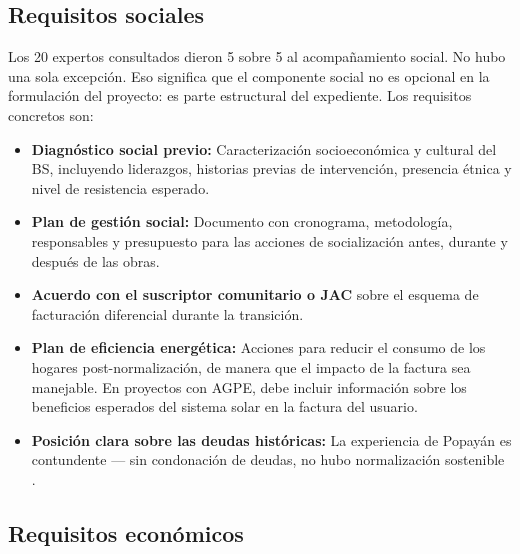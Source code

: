 \subsection{Requisitos sociales}
\label{subsec:req_sociales}

Los 20 expertos consultados dieron 5 sobre 5 al acompañamiento social.
No hubo una sola excepción. Eso significa que el componente social no
es opcional en la formulación del proyecto: es parte estructural del
expediente. Los requisitos concretos son:

\begin{itemize}
    \item \textbf{Diagnóstico social previo:} Caracterización
    socioeconómica y cultural del BS, incluyendo liderazgos, historias
    previas de intervención, presencia étnica y nivel de resistencia
    esperado.

    \item \textbf{Plan de gestión social:} Documento con cronograma,
    metodología, responsables y presupuesto para las acciones de
    socialización antes, durante y después de las obras.

    \item \textbf{Acuerdo con el suscriptor comunitario o JAC} sobre el
    esquema de facturación diferencial durante la transición.

    \item \textbf{Plan de eficiencia energética:} Acciones para reducir
    el consumo de los hogares post-normalización, de manera que el
    impacto de la factura sea manejable. En proyectos con AGPE, debe
    incluir información sobre los beneficios esperados del sistema solar
    en la factura del usuario.

    \item \textbf{Posición clara sobre las deudas históricas:} La
    experiencia de Popayán es contundente — sin condonación de deudas,
    no hubo normalización sostenible \parencite{SerranoRueda2019}.
\end{itemize}

\subsection{Requisitos económicos}
\label{subsec:req_economicos}


